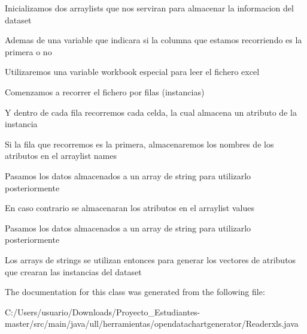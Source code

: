 Inicializamos dos arraylists que nos serviran para almacenar la informacion del dataset

Ademas de una variable que indicara si la columna que estamos recorriendo es la primera o no

Utilizaremos una variable workbook especial para leer el fichero excel

Comenzamos a recorrer el fichero por filas (instancias)

Y dentro de cada fila recorremos cada celda, la cual almacena un atributo de la instancia

Si la fila que recorremos es la primera, almacenaremos los nombres de los atributos en el arraylist names

Pasamos los datos almacenados a un array de string para utilizarlo posteriormente

En caso contrario se almacenaran los atributos en el arraylist values

Pasamos los datos almacenados a un array de string para utilizarlo posteriormente

Los arrays de strings se utilizan entonces para generar los vectores de atributos que crearan las instancias del dataset

The documentation for this class was generated from the following file\+:\begin{DoxyCompactItemize}
\item 
C\+:/\+Users/usuario/\+Downloads/\+Proyecto\+\_\+\+Estudiantes-\/master/src/main/java/ull/herramientas/opendatachartgenerator/Readerxls.\+java\end{DoxyCompactItemize}
